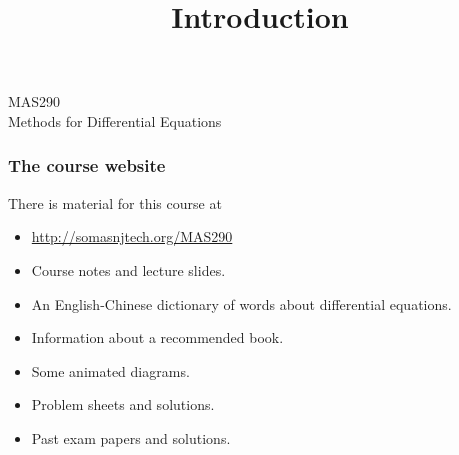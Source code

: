\documentclass[9pt]{beamer}
\title{Introduction}
\author{}
\begin{document}
\begin{frame}[t]
\frametitle{}
 {\Huge
  \vspace{6ex}
  \begin{center}
   MAS290 \\ Methods for Differential Equations
  \end{center}
 }
\end{frame}

\begin{frame}[t]
 \frametitle{The course website}
 
 There is material for this course at 
 \begin{itemize}
  \item \url{http://somasnjtech.org/MAS290}
 \end{itemize}

 \bigskip

 \begin{itemize}
  \item<2-> Course notes and lecture slides.
  \item<3-> An English-Chinese dictionary of words about differential equations.
  \item<4-> Information about a recommended book.
  \item<5-> Some animated diagrams.
  \item<6-> Problem sheets and solutions.
  \item<7-> Past exam papers and solutions.
 \end{itemize}
\end{frame}
\end{document}

